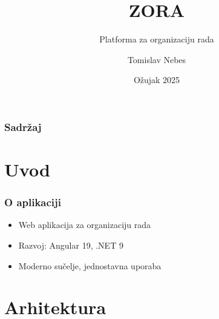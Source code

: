 \documentclass[aspectratio=169]{beamer}
\title{ZORA}
\subtitle{Platforma za organizaciju rada}
\author{Tomislav Nebes}
\date{Ožujak 2025}
\begin{document}
\begin{frame}
    \titlepage
\end{frame}

\begin{frame}
    \frametitle{Sadržaj}
    \tableofcontents
\end{frame}

\section{Uvod}

\begin{frame}
    \frametitle{O aplikaciji}
    \begin{itemize}
        \item Web aplikacija za organizaciju rada
        \item Razvoj: Angular 19, .NET 9
        \item Moderno sučelje, jednostavna uporaba
    \end{itemize}
\end{frame}

\section{Arhitektura}
\end{document}
